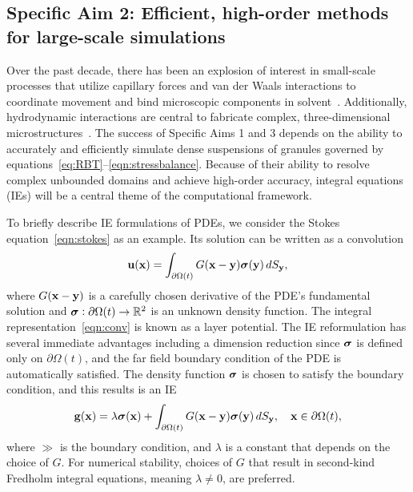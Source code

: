 \subsection{Specific Aim 2: Efficient, high-order methods for
large-scale simulations}
\label{sec:specificaim2}
Over the past decade, there has been an explosion of interest in
small-scale processes that utilize capillary forces and van der Waals
interactions to coordinate movement and bind microscopic components in
solvent~\cite{Pandey2011, Zhang2017, Siontorou2017}. Additionally,
hydrodynamic interactions are central to fabricate complex,
three-dimensional microstructures~\cite{Dasgupta2017, Leong2007,
Reynolds2019, Cho2010}.
The success of Specific Aims 1 and 3 depends on the ability to
accurately and efficiently simulate dense suspensions of granules
governed by equations~\eqref{eq:RBT}--\eqref{eqn:stressbalance}. Because
of their ability to resolve complex unbounded domains and achieve
high-order accuracy, integral equations (IEs) will be a central theme of
the computational framework. 

To briefly describe IE formulations of PDEs, we consider the Stokes
equation~\eqref{eqn:stokes} as an example. Its solution can be written
as a convolution 
\begin{align}
  \mathbf{u}(\mathbf{x}) = \int_{\partial\Omega(t)} G(\mathbf{x} - \mathbf{y}) \boldsymbol{\sigma}(\mathbf{y}) \, dS_{\mathbf{y}},
  \label{eqn:conv}
\end{align}
where $G(\mathbf{x} - \mathbf{y})$ is a carefully chosen derivative of the PDE's
fundamental solution and $\boldsymbol{\sigma}: \partial \Omega(t) \rightarrow \mathbb{R}^2$
is an unknown density function. The integral
representation~\eqref{eqn:conv} is known as a layer potential.
The IE reformulation has several immediate advantages including a
dimension reduction since $\boldsymbol{\sigma}$ is defined only on $\partial
\Omega(t)$, and the far field boundary condition of the PDE is
automatically satisfied. The density function $\boldsymbol{\sigma}$ is chosen to
satisfy the boundary condition, and this results is an IE 
\begin{align}
  \mathbf{g}(\mathbf{x}) = \lambda \boldsymbol{\sigma}(\mathbf{x}) + 
    \int_{\partial\Omega(t)} G(\mathbf{x} - \mathbf{y}) \boldsymbol{\sigma}(\mathbf{y}) \, dS_{\mathbf{y}},
    \quad \mathbf{x} \in \partial\Omega(t),
  \label{eqn:bie}
\end{align} where $\gg$ is the boundary condition, and $\lambda$ is a
constant that depends on the choice of $G$. For numerical stability,
choices of $G$ that result in second-kind Fredholm integral equations,
meaning $\lambda \neq 0$, are preferred.

